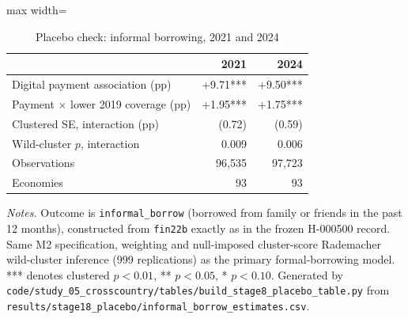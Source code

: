 \begin{table}[htbp]
\centering
\caption{Placebo check: informal borrowing, 2021 and 2024}
\label{tab:stage8placebo}
\begin{adjustbox}{max width=\textwidth}
\begin{tabular}{lrr}
\toprule
 & 2021 & 2024 \\
\midrule
Digital payment association (pp) & +9.71*** & +9.50*** \\
Payment $\times$ lower 2019 coverage (pp) & +1.95*** & +1.75*** \\
Clustered SE, interaction (pp) & (0.72) & (0.59) \\
Wild-cluster $p$, interaction & 0.009 & 0.006 \\
Observations & 96,535 & 97,723 \\
Economies & 93 & 93 \\
\bottomrule
\end{tabular}
\end{adjustbox}
\smallskip
\begin{minipage}{\linewidth}\footnotesize \emph{Notes.}
Outcome is \texttt{informal\_borrow} (borrowed from family or friends in the past 12
months), constructed from \texttt{fin22b} exactly as in the frozen H-000500 record.
Same M2 specification, weighting and null-imposed cluster-score Rademacher wild-cluster
inference (999 replications) as the primary formal-borrowing model. *** denotes clustered
$p<0.01$, ** $p<0.05$, * $p<0.10$. Generated by
\texttt{code/\allowbreak{}study\_05\_crosscountry/\allowbreak{}tables/\allowbreak{}build\_stage8\_placebo\_table.py} from
\texttt{results/\allowbreak{}stage18\_placebo/\allowbreak{}informal\_borrow\_estimates.csv}.\end{minipage}
\end{table}
